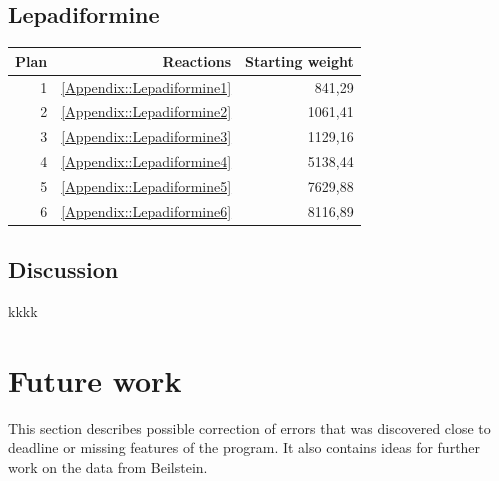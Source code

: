 \documentclass[a4paper,10pt,titlepage]{paper}
\begin{document}
\subsection{Lepadiformine}
\begin{table}[H]
\centering
\begin{tabular}{|r|r|r|}
\hline
Plan & Reactions & Starting weight \\ \hline
1 & \ref{Appendix::Lepadiformine1} & 841,29 \\\hline
2 & \ref{Appendix::Lepadiformine2} & 1061,41 \\\hline
3 & \ref{Appendix::Lepadiformine3} & 1129,16 \\\hline
4 & \ref{Appendix::Lepadiformine4} & 5138,44 \\\hline
5 & \ref{Appendix::Lepadiformine5} & 7629,88 \\\hline
6 & \ref{Appendix::Lepadiformine6} & 8116,89 \\\hline
\end{tabular}
\end{table}

\subsection{Discussion}
kkkk \cite{SynthesisPlans}\\

\section{Future work}
\label{sec::FutureWork}
This section describes possible correction of errors that was discovered close to deadline or missing features of the program. It also contains ideas for further work on the data from Beilstein.
\end{document}
